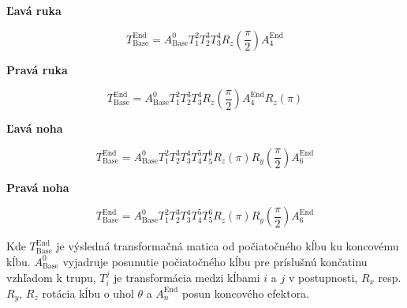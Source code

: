 \textbf{Ľavá ruka}

\begin{equation}
T_{\text{Base}}^{\text{End}} = A_{\text{Base}}^{0} T_{1}^{2} T_{2}^{3} T_{3}^{4} R_{z}\left(\frac{\pi}{2}\right) A_{4}^{\text{End}}
\end{equation}

\textbf{Pravá ruka}

\begin{equation}
T_{\text{Base}}^{\text{End}} = A_{\text{Base}}^{0} T_{1}^{2} T_{2}^{3} T_{3}^{4} R_{z}\left(\frac{\pi}{2}\right) A_{4}^{\text{End}} R_{z}\left(\pi\right)
\end{equation}

\textbf{Ľavá noha}

\begin{equation}
T_{\text{Base}}^{\text{End}} = A_{\text{Base}}^{0} T_{1}^{2} T_{2}^{3} T_{3}^{4} T_{4}^{5} T_{5}^{6} R_{z}\left(\pi\right) R_{y}\left(\frac{\pi}{2}\right) A_{6}^{\text{End}}
\end{equation}

\textbf{Pravá noha}

\begin{equation}
T_{\text{Base}}^{\text{End}} = A_{\text{Base}}^{0} T_{1}^{2} T_{2}^{3} T_{3}^{4} T_{4}^{5} T_{5}^{6} R_{z}\left(\pi\right) R_{y}\left(\frac{\pi}{2}\right) A_{6}^{\text{End}} 
\end{equation}

Kde $T_{\text{Base}}^{\text{End}}$ je výsledná transformačná matica od počiatočného kĺbu ku koncovému kĺbu. $A_{\text{Base}}^{0}$ vyjadruje posunutie počiatočného kĺbu pre príslušnú končatinu vzhľadom k trupu, $T_{i}^{j}$ je transformácia medzi kĺbami $i$ a $j$ v postupnosti, $R_x$ resp. $R_y$, $R_z$ rotácia kĺbu o uhol $\theta$ a $A_{n}^{\text{End}}$ posun koncového efektora.
